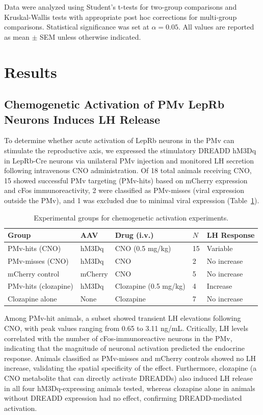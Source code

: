 \documentclass[12pt]{article}
\begin{document}
Data were analyzed using Student's t-tests for two-group comparisons and Kruskal-Wallis tests with appropriate post hoc corrections for multi-group comparisons. Statistical significance was set at $\alpha = 0.05$. All values are reported as mean $\pm$ SEM unless otherwise indicated.

\section{Results}

\subsection{Chemogenetic Activation of PMv LepRb Neurons Induces LH Release}

To determine whether acute activation of LepRb neurons in the PMv can stimulate the reproductive axis, we expressed the stimulatory DREADD hM3Dq in LepRb-Cre neurons via unilateral PMv injection and monitored LH secretion following intravenous CNO administration. Of 18 total animals receiving CNO, 15 showed successful PMv targeting (PMv-hits) based on mCherry expression and cFos immunoreactivity, 2 were classified as PMv-misses (viral expression outside the PMv), and 1 was excluded due to minimal viral expression (Table~\ref{tab:dreadd}).

\begin{table}[htbp]
\centering
\caption{Experimental groups for chemogenetic activation experiments.}
\label{tab:dreadd}
\begin{tabular}{lllll}
\toprule
Group & AAV & Drug (i.v.) & $N$ & LH Response \\
\midrule
PMv-hits (CNO) & hM3Dq & CNO (0.5 mg/kg) & 15 & Variable \\
PMv-misses (CNO) & hM3Dq & CNO & 2 & No increase \\
mCherry control & mCherry & CNO & 5 & No increase \\
PMv-hits (clozapine) & hM3Dq & Clozapine (0.5 mg/kg) & 4 & Increase \\
Clozapine alone & None & Clozapine & 7 & No increase \\
\bottomrule
\end{tabular}
\end{table}

Among PMv-hit animals, a subset showed transient LH elevations following CNO, with peak values ranging from 0.65 to 3.11 ng/mL. Critically, LH levels correlated with the number of cFos-immunoreactive neurons in the PMv, indicating that the magnitude of neuronal activation predicted the endocrine response. Animals classified as PMv-misses and mCherry controls showed no LH increase, validating the spatial specificity of the effect. Furthermore, clozapine (a CNO metabolite that can directly activate DREADDs) also induced LH release in all four hM3Dq-expressing animals tested, whereas clozapine alone in animals without DREADD expression had no effect, confirming DREADD-mediated activation.
\end{document}
